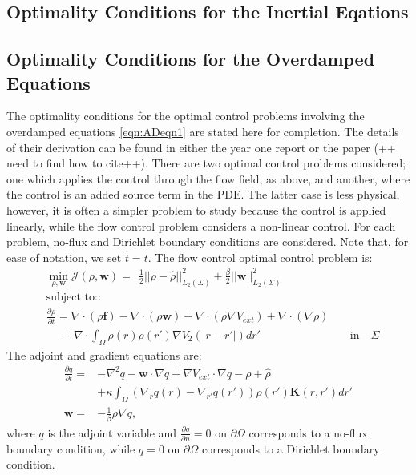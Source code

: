 \documentclass[11pt, a4paper]{article}
\theoremstyle{definition}
\newcommand{\Sta}{\rho}
\newcommand{\Adjb}{q}
\newcommand{\Con}{\mathbf{f}}
\begin{document}
\subsection{Optimality Conditions for the Inertial Eqations}




\subsection{Optimality Conditions for the Overdamped Equations}
The optimality conditions for the optimal control problems involving the overdamped equations \eqref{eqn:ADeqn1} are stated here for completion. The details of their derivation can be found in either the year one report or the paper (++ need to find how to cite++).
There are two optimal control problems considered; one which applies the control through the flow field, as above, and another, where the control is an added source term in the PDE. The latter case is less physical, however, it is often a simpler problem to study because the control is applied linearly, while the flow control problem considers a non-linear control. For each problem, no-flux and Dirichlet boundary conditions are considered. Note that, for ease of notation, we set $\tilde t = t$.
The flow control optimal control problem is:
\begin{align*}
&\min_{\Sta,\mathbf{w} } \mathcal J(\Sta,\mathbf{w} ) =\ \ \frac{1}{2}||\Sta - \hat \Sta||_{L_2(\Sigma)}^2  +\frac{\beta}{2}||\mathbf{w}||_{L_2(\Sigma)}^2\\
& \text{subject to:}:\\
&\frac{\partial \Sta}{\partial t} = \nabla \cdot (\Sta\Con) - \nabla \cdot (\Sta \mathbf{w})  + \nabla \cdot (\rho\nabla V_{ext}) + \nabla \cdot (\nabla \rho) \\
& \quad \ +\nabla \cdot \int_\Omega \Sta(r)\Sta(r') \nabla V_2(|r-r'|)dr' \qquad \qquad \qquad \qquad \text{in} \quad \Sigma
\end{align*}
The adjoint and gradient equations are:
\begin{align*}
\frac{\partial \Adjb}{\partial t} =& - \nabla^2\Adjb - \mathbf{w} \cdot \nabla \Adjb + \nabla V_{ext} \cdot \nabla \Adjb - \Sta + \hat \rho \\
&+\kappa \int_\Omega (\nabla_r \Adjb(r) - \nabla_{r'} \Adjb(r') ) \rho(r') \mathbf{K}(r,r') dr'\\
\mathbf{w} =& - \frac{1}{\beta} \Sta \nabla \Adjb,
\end{align*}
where $\Adjb$ is the adjoint variable and $\frac{\partial \Adjb}{\partial n} = 0$ on $\partial \Omega$ corresponds to a no-flux boundary condition, while $\Adjb = 0$ on $\partial \Omega$ corresponds to a Dirichlet boundary condition.
\end{document}
